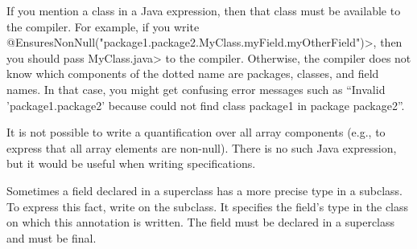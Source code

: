 


If you mention a class in a Java expression, then that class must be
available to the compiler.  For example, if you write
  \<@EnsuresNonNull("package1.package2.MyClass.myField.myOtherField")>,
then you should pass \<MyClass.java> to the compiler.  Otherwise, the
compiler does not know which components of the dotted name are packages,
classes, and field names.  In that case, you might get confusing error
messages such as ``Invalid 'package1.package2' because could not find class
package1 in package package2''.

It is not possible to write a
quantification over all array components (e.g., to express that all
array elements are non-null).  There is no such Java expression, but it
would be useful when writing specifications.



Sometimes a field declared in a superclass has a more precise type in a
subclass.  To express this fact, write
 on the subclass. It specifies
the field's type in the class on which this annotation is written.
The field must be declared in a superclass and
must be final.


